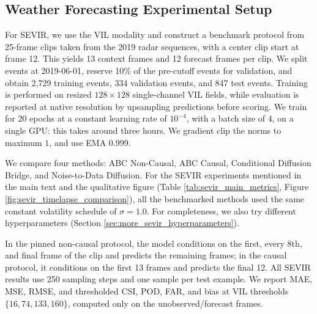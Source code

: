 \subsection{Weather Forecasting Experimental Setup}\label{sec:sevir_additional_details}

For SEVIR, we use the VIL modality \cite{veillette2020sevir} and construct a benchmark protocol from 25-frame clips taken from the 2019 radar sequences, with a center clip start at frame 12. This yields 13 context frames and 12 forecast frames per clip. We split events at 2019-06-01, reserve 10\% of the pre-cutoff events for validation, and obtain 2,729 training events, 334 validation events, and 847 test events. Training is performed on resized $128\times128$ single-channel VIL fields, while evaluation is reported at native resolution by upsampling predictions before scoring.
We train for 20 epochs at a constant learning rate of $10^{-4}$, with a batch size of 4, on a single GPU: this takes around three hours. We gradient clip the norms to maximum $1$, and use EMA 0.999.

We compare four methods: ABC Non-Causal, ABC Causal, Conditional Diffusion Bridge, and Noise-to-Data Diffusion. For the SEVIR experiments mentioned in the main text and the qualitative figure (Table \ref{tab:sevir_main_metrics}, %
Figure \ref{fig:sevir_timelapse_comparison}), all the benchmarked methods used the same constant volatility schedule of $\sigma=1.0$. For completeness, we also try different hyperparameters (Section \ref{sec:more_sevir_hyperparameters}).

In the pinned non-causal protocol, the model conditions on the first, every 8th, and final frame of the clip and predicts the remaining frames; in the causal protocol, it conditions on the first 13 frames and predicts the final 12. All SEVIR results use 250 sampling steps and one sample per test example. We report MAE, MSE, RMSE, and thresholded CSI, POD, FAR, and bias at VIL thresholds $\{16,74,133,160\}$, computed only on the unobserved/forecast frames.
